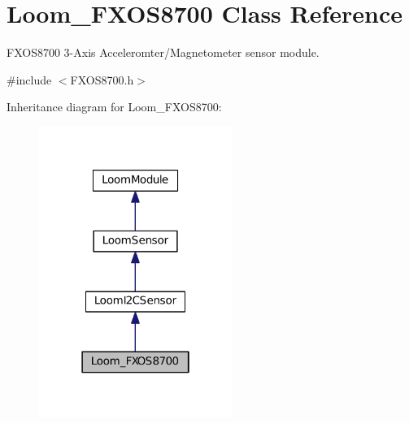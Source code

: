 \hypertarget{class_loom___f_x_o_s8700}{}\section{Loom\+\_\+\+F\+X\+O\+S8700 Class Reference}
\label{class_loom___f_x_o_s8700}


F\+X\+O\+S8700 3-\/\+Axis Acceleromter/\+Magnetometer sensor module.  




{\ttfamily \#include $<$F\+X\+O\+S8700.\+h$>$}



Inheritance diagram for Loom\+\_\+\+F\+X\+O\+S8700\+:\nopagebreak
\begin{figure}[H]
\begin{center}
\leavevmode
\includegraphics[width=178pt]{class_loom___f_x_o_s8700__inherit__graph}
\end{center}
\end{figure}
